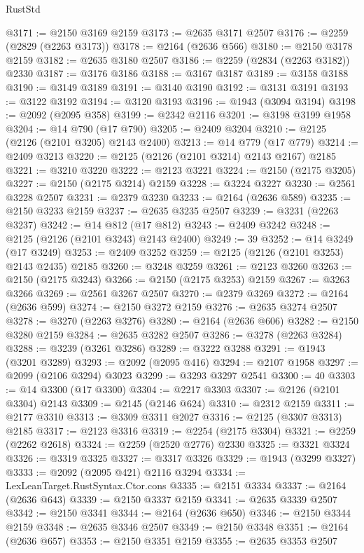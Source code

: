 \begin{lexlean}{RustStd}
\begin{coremodule}
@3171 := @2150 @3169 @2159
@3173 := @2635 @3171 @2507
@3176 := @2259 (@2829 (@2263 @3173))
@3178 := @2164 (@2636 @566)
@3180 := @2150 @3178 @2159
@3182 := @2635 @3180 @2507
@3186 := @2259 (@2834 (@2263 @3182)) @2330
@3187 := @3176 @3186
@3188 := @3167 @3187
@3189 := @3158 @3188
@3190 := @3149 @3189
@3191 := @3140 @3190
@3192 := @3131 @3191
@3193 := @3122 @3192
@3194 := @3120 @3193
@3196 := @1943 (@3094 @3194)
@3198 := @2092 (@2095 @358)
@3199 := @2342 @2116
@3201 := @3198 @3199 @1958
@3204 := @14 @790 (@17 @790)
@3205 := @2409 @3204
@3210 := @2125 (@2126 (@2101 @3205) @2143 @2400)
@3213 := @14 @779 (@17 @779)
@3214 := @2409 @3213
@3220 := @2125 (@2126 (@2101 @3214) @2143 @2167) @2185
@3221 := @3210 @3220
@3222 := @2123 @3221
@3224 := @2150 (@2175 @3205)
@3227 := @2150 (@2175 @3214) @2159
@3228 := @3224 @3227
@3230 := @2561 @3228 @2507
@3231 := @2379 @3230
@3233 := @2164 (@2636 @589)
@3235 := @2150 @3233 @2159
@3237 := @2635 @3235 @2507
@3239 := @3231 (@2263 @3237)
@3242 := @14 @812 (@17 @812)
@3243 := @2409 @3242
@3248 := @2125 (@2126 (@2101 @3243) @2143 @2400)
@3249 := 39
@3252 := @14 @3249 (@17 @3249)
@3253 := @2409 @3252
@3259 := @2125 (@2126 (@2101 @3253) @2143 @2435) @2185
@3260 := @3248 @3259
@3261 := @2123 @3260
@3263 := @2150 (@2175 @3243)
@3266 := @2150 (@2175 @3253) @2159
@3267 := @3263 @3266
@3269 := @2561 @3267 @2507
@3270 := @2379 @3269
@3272 := @2164 (@2636 @599)
@3274 := @2150 @3272 @2159
@3276 := @2635 @3274 @2507
@3278 := @3270 (@2263 @3276)
@3280 := @2164 (@2636 @606)
@3282 := @2150 @3280 @2159
@3284 := @2635 @3282 @2507
@3286 := @3278 (@2263 @3284)
@3288 := @3239 (@3261 @3286)
@3289 := @3222 @3288
@3291 := @1943 (@3201 @3289)
@3293 := @2092 (@2095 @416)
@3294 := @2107 @1958
@3297 := @2099 (@2106 @3294) @3023
@3299 := @3293 @3297 @2541
@3300 := 40
@3303 := @14 @3300 (@17 @3300)
@3304 := @2217 @3303
@3307 := @2126 (@2101 @3304) @2143
@3309 := @2145 (@2146 @624)
@3310 := @2312 @2159
@3311 := @2177 @3310
@3313 := @3309 @3311 @2027
@3316 := @2125 (@3307 @3313) @2185
@3317 := @2123 @3316
@3319 := @2254 (@2175 @3304)
@3321 := @2259 (@2262 @2618)
@3324 := @2259 (@2520 @2776) @2330
@3325 := @3321 @3324
@3326 := @3319 @3325
@3327 := @3317 @3326
@3329 := @1943 (@3299 @3327)
@3333 := @2092 (@2095 @421) @2116 @3294
@3334 := LexLeanTarget.RustSyntax.Ctor.cons
@3335 := @2151 @3334
@3337 := @2164 (@2636 @643)
@3339 := @2150 @3337 @2159
@3341 := @2635 @3339 @2507
@3342 := @2150 @3341
@3344 := @2164 (@2636 @650)
@3346 := @2150 @3344 @2159
@3348 := @2635 @3346 @2507
@3349 := @2150 @3348
@3351 := @2164 (@2636 @657)
@3353 := @2150 @3351 @2159
@3355 := @2635 @3353 @2507

\end{coremodule}
\end{lexlean}
